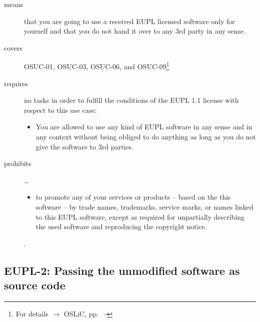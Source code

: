 \begin{description}

\item[means] that you are going to use a received EUPL licensed software only
for yourself and that you do not hand it over to any 3rd party in any sense.

\item[covers] OSUC-01, OSUC-03, OSUC-06, and OSUC-09\footnote{For details 
$\rightarrow$ OSLiC, pp.\ \pageref{OSUC-01-DEF} - \pageref{OSUC-09-DEF}}

\item[requires] no tasks in order to fulfill the conditions of the EUPL 1.1
license with respect to this use case:
  \begin{itemize}
    \item You are allowed to use any kind of EUPL software in any sense and in
    any context without being obliged to do anything as long as you do not
    give the software to 3rd parties.
  \end{itemize}
  
\item[prohibits] \ldots
\begin{itemize}
  \item to promote any of your services or products – based on the this software
  – by trade names, trademarks, service marks, or names linked to this EUPL
  software, except as required for unpartially describing the used software and
  reproducing the copyright notice.
\end{itemize}.

\end{description}

\subsection{EUPL-2: Passing the unmodified software as source code}
\label{OSUC-02-EUPL} \label{OSUC-05-EUPL} \label{OSUC-07-EUPL} 

